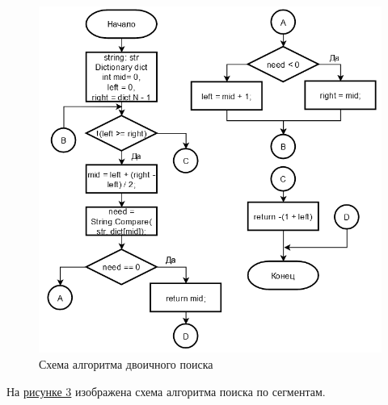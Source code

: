 \documentclass[14pt, a4paper]{extarticle}
\begin{document}
\begin{figure}[h!]
	\centering
	\includegraphics[scale=0.85]{source/alg2.png}
	\caption{Схема алгоритма двоичного поиска}
	\label{Schema2}
\end{figure}
\clearpage
На \hyperref[Schema3]{рисунке 3} изображена схема алгоритма поиска по сегментам.
\end{document}
